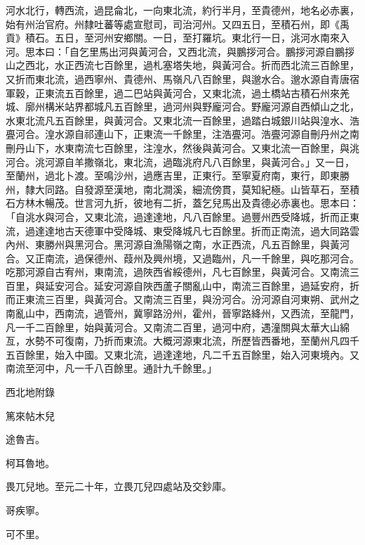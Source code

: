 \begin{pinyinscope}
 河水北行，轉西流，過昆侖北，一向東北流，約行半月，至貴德州，地名必赤裏，始有州治官府。州隸吐蕃等處宣慰司，司治河州。又四五日，至積石州，即《禹貢》積石。五日，至河州安鄉關。一日，至打羅坑。東北行一日，洮河水南來入河。思本曰：「自乞里馬出河與黃河合，又西北流，與鵬拶河合。鵬拶河源自鵬拶山之西北，水正西流七百餘里，過札塞塔失地，與黃河合。折而西北流三百餘里，又折而東北流，過西寧州、貴德州、馬嶺凡八百餘里，與邈水合。邈水源自青唐宿軍穀，正東流五百餘里，過二巴站與黃河合，又東北流，過土橋站古積石州來羌城、廓州構米站界都城凡五百餘里，過河州與野龐河合。野龐河源自西傾山之北，水東北流凡五百餘里，與黃河合。又東北流一百餘里，過踏白城銀川站與湟水、浩亹河合。湟水源自祁連山下，正東流一千餘里，注浩亹河。浩亹河源自刪丹州之南刪丹山下，水東南流七百餘里，注湟水，然後與黃河合。又東北流一百餘里，與洮河合。洮河源自羊撒嶺北，東北流，過臨洮府凡八百餘里，與黃河合。」又一日，至蘭州，過北卜渡。至鳴沙州，過應吉里，正東行。至寧夏府南，東行，即東勝州，隸大同路。自發源至漢地，南北澗溪，細流傍貫，莫知紀極。山皆草石，至積石方林木暢茂。世言河九折，彼地有二折，蓋乞兒馬出及貴德必赤裏也。思本曰：「自洮水與河合，又東北流，過達達地，凡八百餘里。過豐州西受降城，折而正東流，過達達地古天德軍中受降城、東受降城凡七百餘里。折而正南流，過大同路雲內州、東勝州與黑河合。黑河源自漁陽嶺之南，水正西流，凡五百餘里，與黃河合。又正南流，過保德州、葭州及興州境，又過臨州，凡一千餘里，與吃那河合。吃那河源自古宥州，東南流，過陜西省綏德州，凡七百餘里，與黃河合。又南流三百里，與延安河合。延安河源自陜西蘆子關亂山中，南流三百餘里，過延安府，折而正東流三百里，與黃河合。又南流三百里，與汾河合。汾河源自河東朔、武州之南亂山中，西南流，過管州，冀寧路汾州，霍州，晉寧路絳州，又西流，至龍門，凡一千二百餘里，始與黃河合。又南流二百里，過河中府，遇潼關與太華大山綿亙，水勢不可復南，乃折而東流。大概河源東北流，所歷皆西番地，至蘭州凡四千五百餘里，始入中國。又東北流，過達達地，凡二千五百餘里，始入河東境內。又南流至河中，凡一千八百餘里。通計九千餘里。」



 西北地附錄



 篤來帖木兒



 途魯吉。



 柯耳魯地。



 畏兀兒地。至元二十年，立畏兀兒四處站及交鈔庫。



 哥疾寧。



 可不里。




\end{pinyinscope}
